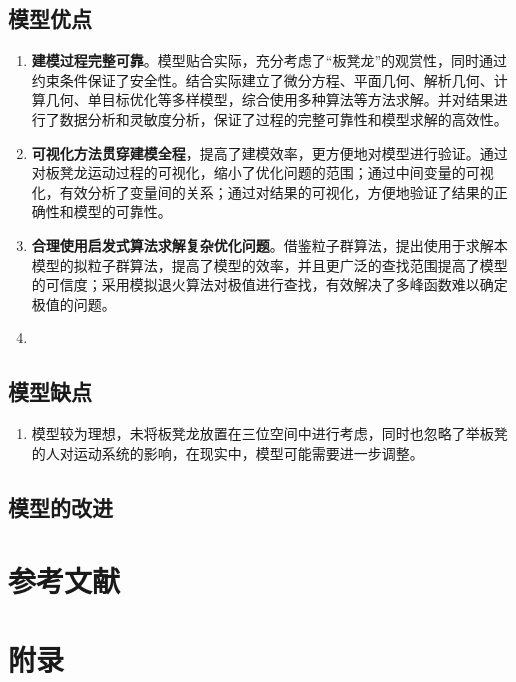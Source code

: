 \documentclass[a4paper]{article}
\begin{document}
	\subsection{模型优点}
	\begin{enumerate}
		\item \textbf{建模过程完整可靠}。模型贴合实际，充分考虑了“板凳龙”的观赏性，同时通过约束条件保证了安全性。结合实际建立了微分方程、平面几何、解析几何、计算几何、单目标优化等多样模型，综合使用多种算法等方法求解。并对结果进行了数据分析和灵敏度分析，保证了过程的完整可靠性和模型求解的高效性。
		\item \textbf{可视化方法贯穿建模全程}，提高了建模效率，更方便地对模型进行验证。通过对板凳龙运动过程的可视化，缩小了优化问题的范围；通过中间变量的可视化，有效分析了变量间的关系；通过对结果的可视化，方便地验证了结果的正确性和模型的可靠性。
		\item \textbf{合理使用启发式算法求解复杂优化问题}。借鉴粒子群算法，提出使用于求解本模型的拟粒子群算法，提高了模型的效率，并且更广泛的查找范围提高了模型的可信度；采用模拟退火算法对极值进行查找，有效解决了多峰函数难以确定极值的问题。
		\item
	\end{enumerate}

	\subsection{模型缺点}
	\begin{enumerate}
		\item 模型较为理想，未将板凳龙放置在三位空间中进行考虑，同时也忽略了举板凳的人对运动系统的影响，在现实中，模型可能需要进一步调整。
	\end{enumerate}

	\subsection{模型的改进}

	
	\section{参考文献}
	\vspace{-2em} %
	\begin{thebibliography}{9}  
	\end{thebibliography}
	
	\newpage
	\section*{附录}
	
\end{document}
